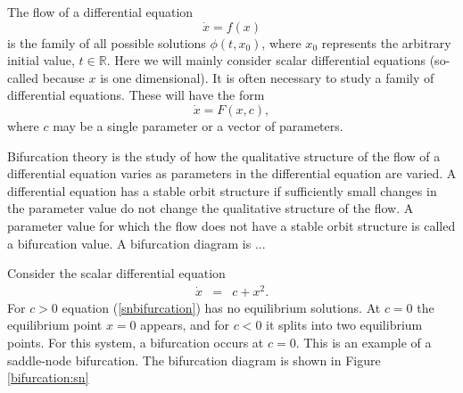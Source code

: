 \label{lab:Bifurcations}

The flow of a differential equation \[\dot{x} = f(x)\] is the family of all possible solutions $\phi(t,x_0)$, where $x_0$ represents the arbitrary initial value, $t \in \mathbb{R}.$ Here we will mainly consider scalar differential equations (so-called because $x$ is one dimensional). It is often necessary to study a family of differential equations. These will have the form 
\[\dot{x}= F(x,c),\]
where $c$ may be a single parameter or a vector of parameters. 

Bifurcation theory is the study of how the qualitative structure of the flow of a differential equation varies as parameters in the differential equation are varied. 
A differential equation has a stable orbit structure if sufficiently small changes in the parameter value do not change the qualitative structure of the flow.
A parameter value for which the flow does not have a stable orbit structure is called a bifurcation value.
A bifurcation diagram is ...

%  



% 
Consider the scalar differential equation 
\begin{eqnarray}
\dot{x} &=& c + x^2. \label{snbifurcation}
\end{eqnarray}
For $c>0$ equation (\ref{snbifurcation}) has no equilibrium solutions. At $c=0$ the equilibrium point $x=0$ appears, and for $c<0$ it splits into two equilibrium points. For this system, a bifurcation occurs at $c=0$. This is an example of a saddle-node bifurcation. The bifurcation diagram is shown in Figure \ref{bifurcation:sn} 


